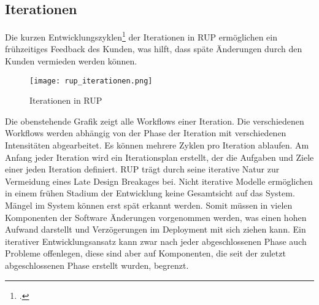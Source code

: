 \subsection{Iterationen}
Die kurzen Entwicklungszyklen\footcite{rup-workflows} der Iterationen in RUP ermöglichen ein frühzeitiges Feedback des Kunden, was hilft, dass späte Änderungen durch den Kunden vermieden werden können. 
\begin{center}
\begin{figure}[h]
	\centering
	\texttt{[image: rup\_iterationen.png]}
	\caption{Iterationen in RUP}
\end{figure}
\end{center}
Die obenstehende Grafik zeigt alle Workflows einer Iteration. Die verschiedenen Workflows werden abhängig von der Phase der Iteration mit verschiedenen Intensitäten abgearbeitet. 
Es können mehrere Zyklen pro Iteration ablaufen.
Am Anfang jeder Iteration wird ein Iterationsplan erstellt, der die Aufgaben und Ziele einer jeden Iteration definiert. 
RUP trägt durch seine iterative Natur zur Vermeidung eines Late Design Breakages bei. Nicht iterative Modelle ermöglichen in einem frühen Stadium der Entwicklung keine Gesamtsicht auf das System. Mängel im System können erst spät erkannt werden. Somit müssen in vielen Komponenten der Software Änderungen vorgenommen werden, was einen hohen Aufwand darstellt und Verzögerungen im Deployment mit sich ziehen kann. 
Ein iterativer Entwicklungsansatz kann zwar nach jeder abgeschlossenen Phase auch Probleme offenlegen, diese sind aber auf Komponenten, die seit der zuletzt abgeschlossenen Phase erstellt wurden, begrenzt.
